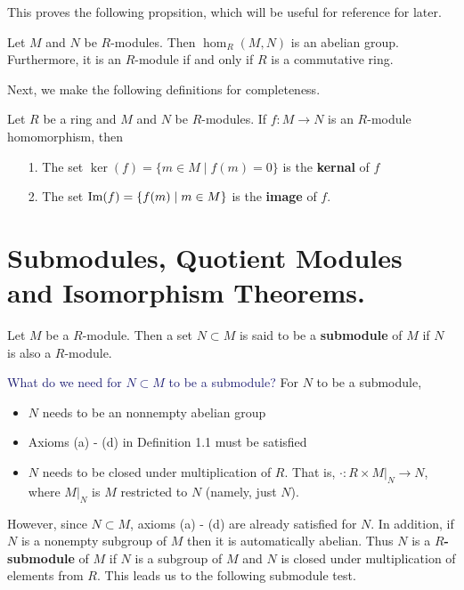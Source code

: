 This proves the following propsition, which will be useful for
reference for later.
\begin{proposition}\label{hom_abelian_module}
    Let $M$ and $N$ be $R$-modules. Then $\hom_R(M, N)$ is an
    abelian group. Furthermore, it is an 
    $R$-module if and only if $R$ is a commutative ring.
\end{proposition}
Next, we make the following definitions for completeness. 

\begin{definition}
    Let $R$ be a ring and $M$ and $N$ be $R$-modules. If $f: M \to
    N$ is an $R$-module homomorphism, then 
    \begin{itemize}
        \item[1.] The set $\ker(f) = \{m \in M \mid f(m) = 0\}$ is
        the \textbf{kernal} of $f$ 
        \item[2.] The set $\mbox{Im}(f) = \{f(m) \mid m \in M\}$ is the
        \textbf{image} of $f$.
    \end{itemize}
\end{definition}






\newpage 
\section{Submodules, Quotient Modules and Isomorphism Theorems.}

\begin{definition}
    Let $M$ be a $R$-module. Then a set $N \subset M$ is said to
    be a \textbf{submodule} of $M$ if $N$ is also a $R$-module. 
\end{definition}

\textcolor{MidnightBlue}{What do we need for $N \subset M$ to be a submodule?}
For $N$ to be a submodule,
\begin{itemize}
    \item $N$ needs to be an nonnempty abelian group 
    \item Axioms (a) - (d) in Definition 1.1 must be satisfied 
    \item $N$ needs to be closed under multiplication of $R$. That
    is, $\cdot : R \times M|_{N} \to N$, where $M|_N$ is $M$
    restricted to $N$ (namely, just $N$).
\end{itemize}

However, since $N \subset M$, axioms (a) - (d) are already
satisfied for $N$. In addition, if $N$ is a nonempty subgroup of $M$ then
it is automatically abelian. Thus $N$ is a \textbf{$R$-submodule} of $M$ if $N$
is a subgroup of $M$ and $N$ is closed under multiplication of
elements from $R$. This leads us to the following submodule test. 

